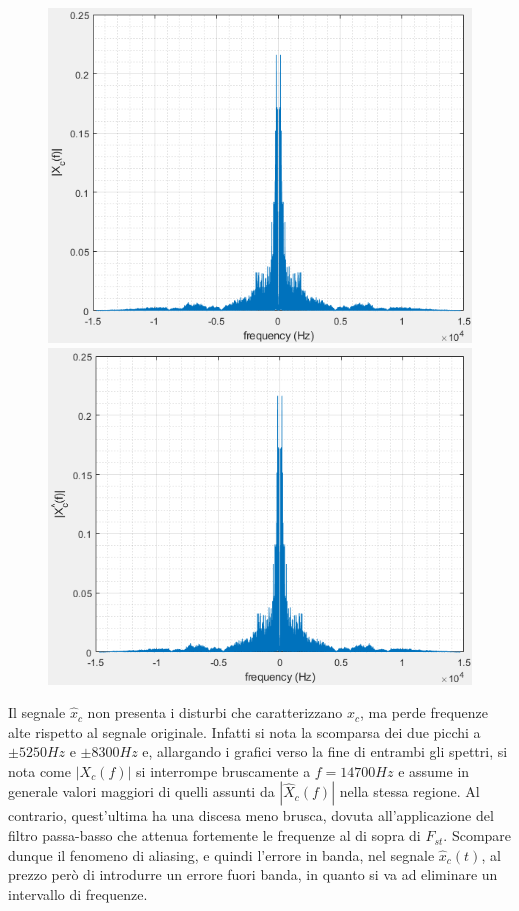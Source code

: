 \documentclass[12pt]{article}
\begin{document}
\begin{figure}[H]
	\includegraphics[width=0.5\linewidth]{./images/fft_x_c.png}
	\includegraphics[width=0.5\linewidth]{./images/fft_x_c_hat.png}
\end{figure}

Il segnale $\hat{x}_{c}$ non presenta i disturbi che caratterizzano $x_{c}$, ma perde frequenze alte rispetto al segnale originale. Infatti si nota la scomparsa dei due picchi a $\pm5250Hz$ e $\pm8300Hz$ e, allargando i grafici verso la fine di entrambi gli spettri, si nota come $|X_{c}(f)|$ si interrompe bruscamente a $f = 14700Hz$ e assume in generale valori maggiori di quelli assunti da $|\hat{X}_{c}(f)|$ nella stessa regione. Al contrario, quest'ultima ha una discesa meno brusca, dovuta all'applicazione del filtro passa-basso che attenua fortemente le frequenze al di sopra di $F_{st}$. Scompare dunque il fenomeno di aliasing, e quindi l'errore in banda, nel segnale $\hat{x}_{c}(t)$, al prezzo però di introdurre un errore fuori banda, in quanto si va ad eliminare un intervallo di frequenze.
\end{document}
